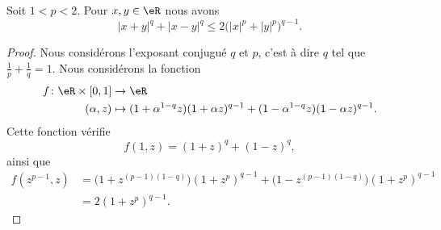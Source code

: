 \begin{lemma}         \label{LEMooMKIXooVOYaxI}
    Soit \( 1<p<2\). Pour \( x,y\in \eR\) nous avons
    \begin{equation}
        | x+y |^q+| x-y |^q\leq 2\big( | x |^p+| y |^p \big)^{q-1}.
    \end{equation}
\end{lemma}

\begin{proof}
    Nous considérons l'exposant conjugué \( q\) et \( p\), c'est à dire \( q\) tel que \( \frac{1}{ p }+\frac{1}{ q }=1\). Nous considérons la fonction
    \begin{equation}
        \begin{aligned}
            f\colon \eR\times \mathopen[ 0 , 1 \mathclose]&\to \eR \\
            (\alpha,z)&\mapsto (1+\alpha^{1-q}z)(1+\alpha z)^{q-1}+(1-\alpha^{1-q}z)(1-\alpha z)^{q-1}. 
        \end{aligned}
    \end{equation}
    Cette fonction vérifie
    \begin{equation}        \label{EQooRFZQooJvdocT}
        f(1,z)=(1+z)^q+(1-z)^q,
    \end{equation}
    ainsi que
    \begin{subequations}        \label{EQooISBRooHMiPRE}
        \begin{align}
            f(z^{p-1},z)&=\big( 1+z^{(p-1)(1-q)} \big)(1+z^p)^{q-1}+\big( 1-z^{(p-1)(1-q)} \big)(1+z^p)^{q-1}\\
            &=2(1+z^p)^{q-1}.
        \end{align}
    \end{subequations}


\end{proof}
